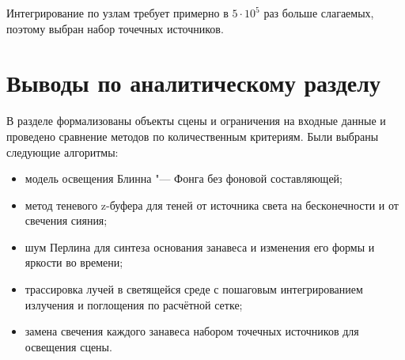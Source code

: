 Интегрирование по узлам требует примерно в $5 \cdot 10^5$ раз больше слагаемых, поэтому выбран набор точечных источников.

\section*{Выводы по аналитическому разделу}

В разделе формализованы объекты сцены и ограничения на входные данные и проведено сравнение методов по количественным критериям. Были выбраны следующие алгоритмы:
\begin{itemize}
	\item модель освещения Блинна "--- Фонга без фоновой составляющей;
	\item метод теневого z-буфера для теней от источника света на бесконечности и от свечения сияния;
	\item шум Перлина для синтеза основания занавеса и изменения его формы и яркости во времени;
	\item трассировка лучей в светящейся среде с пошаговым интегрированием излучения и поглощения по расчётной сетке;
	\item замена свечения каждого занавеса набором точечных источников для освещения сцены.
\end{itemize}
